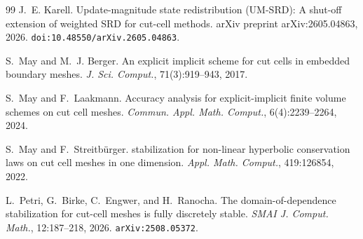 \documentclass[preprint,12pt]{elsarticle}
\begin{document}
\begin{thebibliography}{99}
J.~E. Karell.
\newblock Update-magnitude state redistribution ({UM-SRD}): A shut-off
  extension of weighted {SRD} for cut-cell methods.
\newblock arXiv preprint arXiv:2605.04863, 2026.
\newblock \texttt{doi:10.48550/arXiv.2605.04863}.

S.~May and M.~J. Berger.
\newblock An explicit implicit scheme for cut cells in embedded boundary meshes.
\newblock \emph{J. Sci. Comput.}, 71(3):919--943, 2017.

S.~May and F.~Laakmann.
\newblock Accuracy analysis for explicit-implicit finite volume schemes on
  cut cell meshes.
\newblock \emph{Commun. Appl. Math. Comput.},
  6(4):2239--2264, 2024.

S.~May and F.~Streitb{\"u}rger.
 stabilization for non-linear hyperbolic conservation laws on
  cut cell meshes in one dimension.
\newblock \emph{Appl. Math. Comput.}, 419:126854, 2022.

L.~Petri, G.~Birke, C.~Engwer, and H.~Ranocha.
\newblock The domain-of-dependence stabilization for cut-cell meshes is fully
  discretely stable.
\newblock \emph{SMAI J. Comput. Math.}, 12:187--218, 2026.
\newblock \texttt{arXiv:2508.05372}.
\end{thebibliography}
\end{document}
